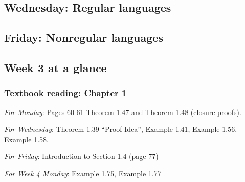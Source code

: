 
    
\newpage
\subsection*{Wednesday: Regular languages}




\newpage
\subsection*{Friday: Nonregular languages}



\newpage

\subsection*{Week 3 at a glance}

\subsubsection*{Textbook reading: Chapter 1}

{\it For Monday}: Pages 60-61 Theorem 1.47 and Theorem 1.48 (closure proofs).

{\it For Wednesday}: Theorem 1.39 ``Proof Idea'', Example 1.41, Example 1.56, Example 1.58.

{\it For Friday}: Introduction to Section 1.4 (page 77)

{\it For Week 4 Monday}: Example 1.75, Example 1.77

